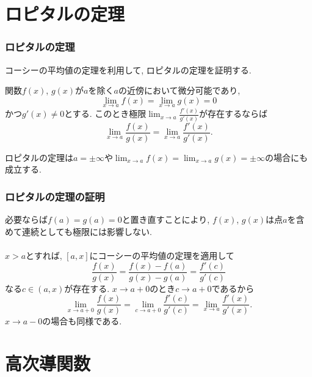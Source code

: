 \section{ロピタルの定理}

\begin{frame}
\frametitle{ロピタルの定理}

コーシーの平均値の定理を利用して, ロピタルの定理を証明する. 

\begin{Thm}[ロピタルの定理]
関数$f(x)$, $g(x)$が$a$を除く$a$の近傍において微分可能であり, 
$$
\lim_{x\to a}f(x) = \lim_{x\to a}g(x)=0
$$
かつ$g'(x) \ne0$とする. このとき極限$\displaystyle \lim_{x\to a}\frac{f'(x)}{g'(x)}$が存在するならば
$$
\lim_{x\to a}\frac{f(x)}{g(x)} = \lim_{x\to a}\frac{f'(x)}{g'(x)}. 
$$
\end{Thm}

ロピタルの定理は$a=\pm \infty$や$\displaystyle \lim_{x\to a}f(x) = \lim_{x\to a}g(x)=\pm \infty$の場合にも成立する. 

\end{frame}





\begin{frame}
\frametitle{ロピタルの定理の証明}
必要ならば$f(a)=g(a)=0$と置き直すことにより, $f(x)$, $g(x)$は点$a$を含めて連続としても極限には影響しない. \\
\ \\

$x>a$とすれば, $[a, x]$にコーシーの平均値の定理を適用して
$$
\frac{f(x)}{g(x)}=
\frac{f(x)-f(a)}{g(x)-g(a)}=
\frac{f'(c)}{g'(c)}
$$
なる$c \in (a,x)$が存在する. 
$x \to a+0$のとき$c \to a +0$であるから
$$
\lim_{x\to a+0}\frac{f(x)}{g(x)}  = \lim_{c \to a+0}\frac{f'(c)}{g'(c)}= \lim_{x\to a}\frac{f'(x)}{g'(x)}. 
$$
$x \to a-0$の場合も同様である. 

\end{frame}







\section{高次導関数}


